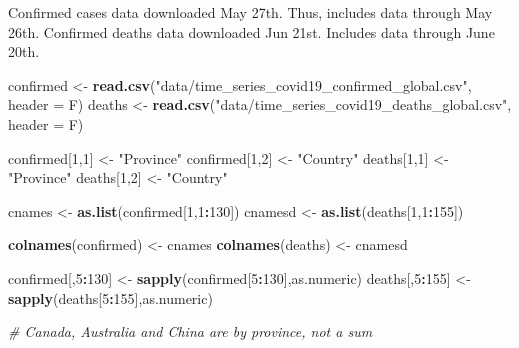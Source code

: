 \documentclass[
]{article}
\newenvironment{Shaded}{\begin{snugshade}}{\end{snugshade}}
\newcommand{\CommentTok}[1]{\textcolor[rgb]{0.56,0.35,0.01}{\textit{#1}}}
\newcommand{\DataTypeTok}[1]{\textcolor[rgb]{0.13,0.29,0.53}{#1}}
\newcommand{\DecValTok}[1]{\textcolor[rgb]{0.00,0.00,0.81}{#1}}
\newcommand{\KeywordTok}[1]{\textcolor[rgb]{0.13,0.29,0.53}{\textbf{#1}}}
\newcommand{\NormalTok}[1]{#1}
\newcommand{\OperatorTok}[1]{\textcolor[rgb]{0.81,0.36,0.00}{\textbf{#1}}}
\newcommand{\StringTok}[1]{\textcolor[rgb]{0.31,0.60,0.02}{#1}}
\begin{document}
Confirmed cases data downloaded May 27th. Thus, includes data through
May 26th. Confirmed deaths data downloaded Jun 21st. Includes data
through June 20th.

\begin{Shaded}
\begin{Highlighting}[]
\NormalTok{confirmed <-}\StringTok{ }\KeywordTok{read.csv}\NormalTok{(}\StringTok{"data/time_series_covid19_confirmed_global.csv"}\NormalTok{, }\DataTypeTok{header =}\NormalTok{ F)}
\NormalTok{deaths <-}\StringTok{ }\KeywordTok{read.csv}\NormalTok{(}\StringTok{"data/time_series_covid19_deaths_global.csv"}\NormalTok{, }\DataTypeTok{header =}\NormalTok{ F)}


\NormalTok{confirmed[}\DecValTok{1}\NormalTok{,}\DecValTok{1}\NormalTok{] <-}\StringTok{ "Province"}
\NormalTok{confirmed[}\DecValTok{1}\NormalTok{,}\DecValTok{2}\NormalTok{] <-}\StringTok{ "Country"}
\NormalTok{deaths[}\DecValTok{1}\NormalTok{,}\DecValTok{1}\NormalTok{] <-}\StringTok{ "Province"}
\NormalTok{deaths[}\DecValTok{1}\NormalTok{,}\DecValTok{2}\NormalTok{] <-}\StringTok{ "Country"}

\NormalTok{cnames <-}\StringTok{ }\KeywordTok{as.list}\NormalTok{(confirmed[}\DecValTok{1}\NormalTok{,}\DecValTok{1}\OperatorTok{:}\DecValTok{130}\NormalTok{])}
\NormalTok{cnamesd <-}\StringTok{ }\KeywordTok{as.list}\NormalTok{(deaths[}\DecValTok{1}\NormalTok{,}\DecValTok{1}\OperatorTok{:}\DecValTok{155}\NormalTok{])}

\KeywordTok{colnames}\NormalTok{(confirmed) <-}\StringTok{ }\NormalTok{cnames}
\KeywordTok{colnames}\NormalTok{(deaths) <-}\StringTok{ }\NormalTok{cnamesd}

\NormalTok{confirmed[,}\DecValTok{5}\OperatorTok{:}\DecValTok{130}\NormalTok{] <-}\StringTok{ }\KeywordTok{sapply}\NormalTok{(confirmed[}\DecValTok{5}\OperatorTok{:}\DecValTok{130}\NormalTok{],as.numeric)}
\NormalTok{deaths[,}\DecValTok{5}\OperatorTok{:}\DecValTok{155}\NormalTok{] <-}\StringTok{ }\KeywordTok{sapply}\NormalTok{(deaths[}\DecValTok{5}\OperatorTok{:}\DecValTok{155}\NormalTok{],as.numeric)}

\CommentTok{# Canada, Australia and China are by province, not a sum}


\end{Highlighting}
\end{Shaded}
\end{document}
